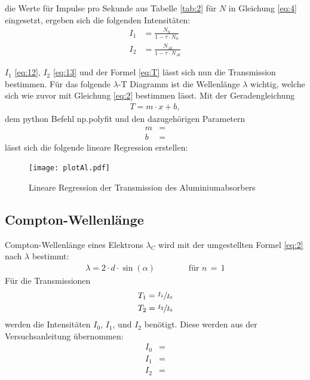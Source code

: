     \justifying die Werte für Impulse pro Sekunde aus Tabelle \ref{tab:2} für $N$ in Gleichung \eqref{eq:4} eingesetzt, ergeben sich die folgenden Intensitäten:
    \begin{align}
        I_1 &= \frac{N_0}{1- \tau \cdot N_0}   \label{eq:12}\\
        I_2 &= \frac{N_{Al}}{1- \tau \cdot N_{Al}} \label{eq:13}
    \end{align}

    \justifying $I_1$ \eqref{eq:12}, $I_2$ \eqref{eq:13} und der Formel \eqref{eq:T} lässt sich nun die Transmission bestimmen. Für das folgende $\lambda$-T Diagramm
    ist die Wellenlänge $\lambda$ wichtig, welche sich wie zuvor mit Gleichung \eqref{eq:2} bestimmen lässt. Mit der Geradengleichung 
    \begin{align}
    T = m \cdot x + b, \label{eq:14}
    \end{align}
    dem python Befehl np.polyfit 
    \cite{numpy} und den dazugehörigen Parametern
    \begin{align}
        m &= \text{} \label{eq:15}\\
        b &= \text{} \label{eq:16}
    \end{align}
    lässt sich die folgende lineare Regression erstellen:

    \begin{figure}[H]
        \centering
        \texttt{[image: plotAl.pdf]}
        \caption{Lineare Regression der Transmission des Aluminiumabsorbers}
        \label{fig:3}
    \end{figure}

    \subsection{Compton-Wellenlänge}

    \justifying Compton-Wellenlänge eines Elektrons $\lambda_C$ wird mit der umgestellten Formel \eqref{eq:2} nach $\lambda$ bestimmt:
    \begin{align}
        \lambda = 2 \cdot d \cdot \sin(\alpha) \qquad \qquad \text{für $n\,=\,1$} \label{eq:17}
    \end{align} 
    Für die Transmissionen
    \begin{align}
        T_1 &= \sfrac{I_1}{I_0} \\
        T_2 &= \sfrac{I_2}{I_0} 
    \end{align}
    werden die Intensitäten $I_0$, $I_1$, und $I_2$ benötigt. Diese werden aus der Versuchsanleitung \cite{V603} übernommen:
    \begin{subequations}\label{eq:18}
    \begin{align}
        I_0 &= \text{} \label{eq:18a}\\
        I_1 &= \text{} \label{eq:18b}\\
        I_2 &= \text{} \label{eq:18c}
    \end{align}
    \end{subequations}

